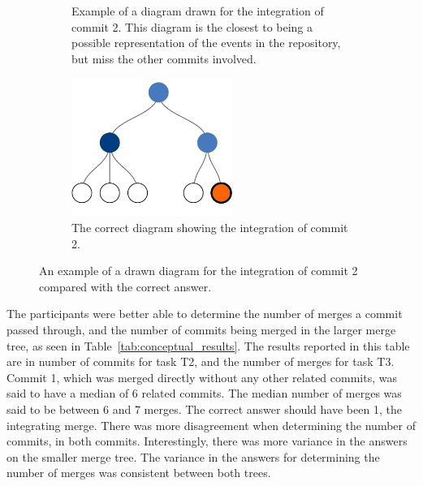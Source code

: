 \begin{figure}[htpb]
  \centering

  \begin{subfigure}[b]{0.9\textwidth}
    \centering
    \caption{Example of a diagram drawn for the integration of commit 2.
      This diagram is the closest to being a possible representation of
      the events in the repository, but miss the other commits involved.}
    \label{fig:commit_2_fig}

  \end{subfigure}

  \begin{subfigure}[b]{0.9\textwidth}
    \centering
    \includegraphics[height=4.5cm]{Figures/evaluation/commit2_linvis.pdf}
    \caption{The correct diagram showing the integration of commit 2.}
    \label{fig:commit_2_answer}
  \end{subfigure}

  \caption{An example of a drawn diagram for the integration of commit 2
    compared with the correct answer.}

\end{figure}

The participants were better able to determine the number of merges a
commit passed through, and the number of commits being merged in the
larger merge tree, as seen in Table~\ref{tab:conceptual_results}. The
results reported in this table are in number of commits for task T2, and
the number of merges for task T3. Commit 1, which was merged directly
without any other related commits, was said to have a median of 6
related commits. The median number of merges was said to be between 6
and 7 merges. The correct answer should have been 1, the integrating
merge. There was more disagreement when determining the number of
commits, in both commits. Interestingly, there was more variance in the
answers on the smaller merge tree. The variance in the answers for
determining the number of merges was consistent between both trees.

